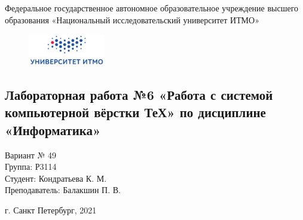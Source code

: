 \begin{center}
\large
Федеральное государственное автономное образовательное учреждение высшего образования
«Национальный исследовательский университет ИТМО»
\end{center}

\begin{figure}[h]
\centering
\includegraphics[width=0.3\textwidth]{logo.png}
\end{figure}
\vspace{1cm}
\begin{center}
\section*{Лабораторная работа №6 «Работа с системой компьютерной вёрстки ТеХ» по дисциплине \\ «Информатика»}
\end{center}
\vspace{9cm}
\begin{flushright}
\Large
 Вариант № 49\\
 Группа: Р3114\\
Студент: Кондратьева К. М.\\
Преподаватель: Балакшин П. В.\\
\end{flushright}
\vspace{5cm}
\begin{center}
г. Санкт Петербург, 2021
\end{center}

\thispagestyle{empty}
